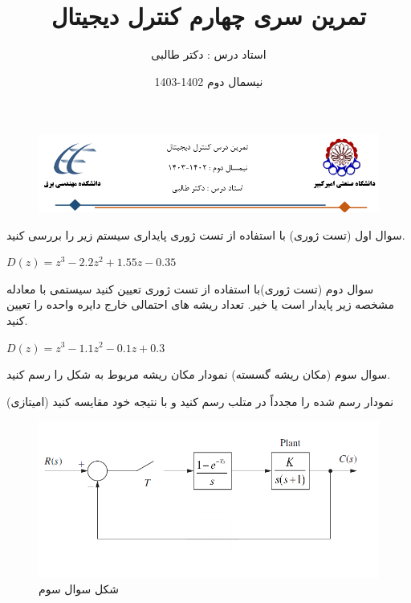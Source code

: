 \documentclass[12pt]{article}
\title{تمرین سری چهارم کنترل دیجیتال}
\date{نیسمال دوم 1402-1403}
\author{استاد درس : دکتر طالبی}
\begin{document}
\markboth{\theauthor}{\thetitle}



\begin{figure}[htbp]
    \centering
    \includegraphics[width=\linewidth]{Header.png}
\end{figure}



    \begin{problem}{سوال اول}
    	(تست ژوری) با استفاده از تست ژوری پایداری سیستم زیر را بررسی کنید.
    	
    	\centering
    	$D(z) = z^3 - 2.2z^2 + 1.55z - 0.35$

    \end{problem}
    
    \begin{problem}{سوال دوم}
    	(تست ژوری)با استفاده از تست ژوری تعیین کنید سیستمی با معادله مشخصه زیر پایدار است یا خیر. تعداد ریشه های احتمالی خارج دایره واحده را تعیین کنید.
    	
    	\centering
    	$D(z) = z^3 -1.1z^2 - 0.1z + 0.3$
 
    \end{problem}
    
    \begin{problem}{سوال سوم}
    	(مکان ریشه گسسته) نمودار مکان ریشه مربوط به شکل را رسم کنید.
    	
    	(امیتازی) نمودار رسم شده را مجدداً در متلب رسم کنید و با نتیجه خود مقایسه کنید
   
    \end{problem}
    \begin{figure}
    	\includegraphics[width=\linewidth]{Resources/1.png}
    	\caption{شکل سوال سوم}
    \end{figure}
    
\end{document}
